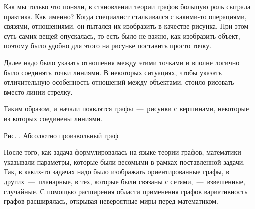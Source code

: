 \begin{paracol}{2}
	Как мы только что поняли, в становлении теории графов большую роль сыграла практика. Как именно? Когда специалист сталкивался с какими-то операциями, связями, отношениями, он пытался их изобразить в качестве рисунка. При этом суть самих вещей опускалась, то есть было не важно, как изобразить объект, поэтому было удобно для этого на рисунке поставить просто точку.
	
	Далее надо было указать отношения между этими точками и вполне логично было соединять точки линиями. В некоторых ситуациях, чтобы указать отличительную особенность отношений между объектами, стоило рисовать вместо линии стрелку.
	
	Таким образом, и начали появлятся графы~---~рисунки с вершинами, некоторые из которых соединены линиями.
	 
\switchcolumn

\begin{center}
	\small Рис. \images. Абсолютно произвольный граф 
\end{center} \end{paracol}
	
	После того, как задача формулировалась на языке теории графов, математики указывали параметры, которые были весомыми в рамках поставленной задачи. Так, в каких-то задачах надо было изображать ориентированные графы, в других~---~планарные, в тех, которые были связаны с сетями,~---~взвешенные, случайные. С помощью расширения области применения графов вариативность графов расширялась, открывая невероятные миры перед математиком.	 


